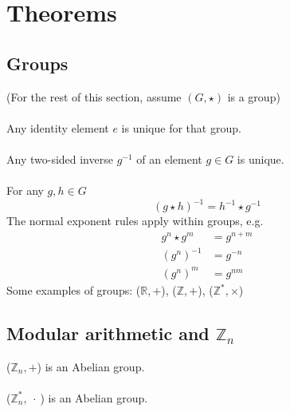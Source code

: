 \documentclass{article}
\newcommand{\R}{\mathbb{R}}
\newcommand{\Z}{\mathbb{Z}}
\begin{document}
\section{Theorems}

\subsection{Groups}
(For the rest of this section, assume $ (G, \star) $ is a group)
\\\\
Any identity element $ e $ is unique for that group.
\\\\
Any two-sided inverse $ g^{-1} $ of an element $ g \in G $ is unique.
\\\\
For any $g, h \in G $
\begin{equation}
(g \star h)^{-1} = h^{-1} \star g^{-1}
\end{equation}
The normal exponent rules apply within groups, e.g.
\begin{align}
g^{n} \star g^{m} & = g^{n+m} \\
(g^{n})^{-1} & = g^{-n} \\
(g^{n})^{m} & = g^{nm}
\end{align}
Some examples of groups:
($ \R, + $), ($ \Z, + $), ($ \Z^{*}, \times $)


\subsection{Modular arithmetic and $ \Z_{n} $}
($ \Z_{n}, + $) is an Abelian group.
\\\\
($ \Z_{n}^{*}, \ \cdot \ $) is an Abelian group.
\end{document}

